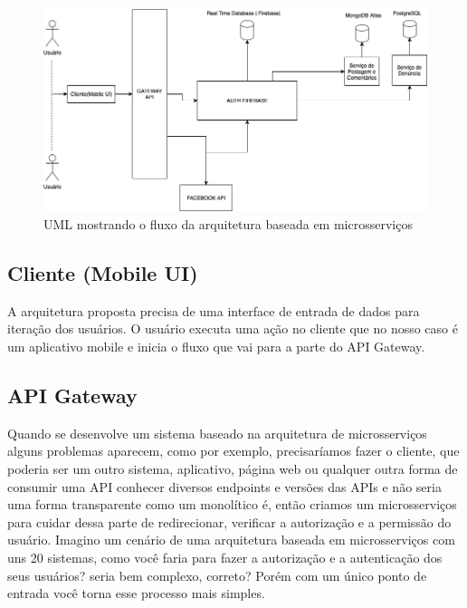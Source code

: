 \begin{figure}[htbp]
\hypertarget{arquitetura}{%
\caption{UML mostrando o fluxo da arquitetura baseada em microsserviços}
\begin{center}
\includegraphics[width=15cm]{Monografia-FormatoLatex/Imagens/microservice-fluxograma.png}
\end{center}
}
\label{microservice-fluxograma}
\end{figure}

\subsection{Cliente (Mobile UI)}
  
  A arquitetura proposta precisa de uma interface de entrada de dados para iteração dos usuários. O usuário executa uma ação no cliente que no nosso caso é um aplicativo mobile e inicia o fluxo que vai para a parte do API Gateway.
  
\subsection{API Gateway}

  Quando se desenvolve um sistema baseado na arquitetura de microsserviços alguns problemas aparecem, como por exemplo, precisaríamos fazer o cliente, que poderia ser um outro sistema, aplicativo, página web ou qualquer outra forma de consumir uma API conhecer diversos endpoints e versões das APIs e não seria uma forma transparente como um monolítico é, então criamos um microsserviços para cuidar dessa parte de redirecionar, verificar a autorização e a permissão do usuário. Imagino um cenário de uma arquitetura baseada em microsserviços com uns 20 sistemas, como você faria para fazer a autorização e a autenticação dos seus usuários? seria bem complexo, correto? Porém com um único ponto de entrada você torna esse processo mais simples.

